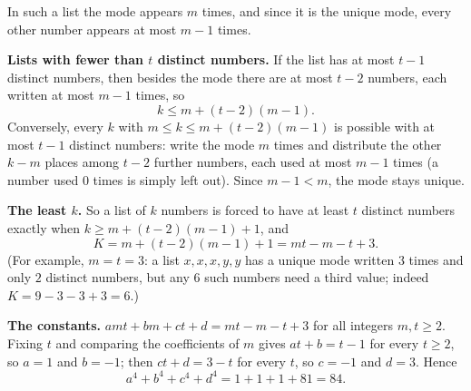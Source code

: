 In such a list the mode appears $m$ times, and since it is the unique mode, every other number appears at most $m-1$ times.

\textbf{Lists with fewer than $t$ distinct numbers.} If the list has at most $t-1$ distinct numbers, then besides the mode there are at most $t-2$ numbers, each written at most $m-1$ times, so
\[k\le m+(t-2)(m-1).\]
Conversely, every $k$ with $m\le k\le m+(t-2)(m-1)$ is possible with at most $t-1$ distinct numbers: write the mode $m$ times and distribute the other $k-m$ places among $t-2$ further numbers, each used at most $m-1$ times (a number used $0$ times is simply left out). Since $m-1<m$, the mode stays unique.

\textbf{The least $k$.} So a list of $k$ numbers is forced to have at least $t$ distinct numbers exactly when $k\ge m+(t-2)(m-1)+1$, and
\[K=m+(t-2)(m-1)+1=mt-m-t+3.\]
(For example, $m=t=3$: a list $x,x,x,y,y$ has a unique mode written $3$ times and only $2$ distinct numbers, but any $6$ such numbers need a third value; indeed $K=9-3-3+3=6$.)

\textbf{The constants.} $amt+bm+ct+d=mt-m-t+3$ for all integers $m,t\ge2$. Fixing $t$ and comparing the coefficients of $m$ gives $at+b=t-1$ for every $t\ge2$, so $a=1$ and $b=-1$; then $ct+d=3-t$ for every $t$, so $c=-1$ and $d=3$. Hence
\[a^4+b^4+c^4+d^4=1+1+1+81=\boxed{84}.\]

